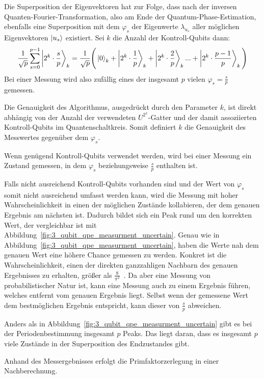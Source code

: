 Die Superposition der Eigenvektoren hat zur Folge, 
dass nach der inversen Quanten-Fourier-Transformation, also am Ende der Quantum-Phase-Estimation,
ebenfalls eine Superposition mit dem \(\varphi_s\) der Eigenwerte \(\lambda_{u_s}\) aller möglichen Eigenvektoren \(\ket{u_s}\) existiert.
Sei \(k\) die Anzahl der Kontroll-Qubits dann:
\[
    \frac{1}{\sqrt{p}} \sum_{s=0}^{p-1}\ket{2^k \cdot \frac{s}{p}}_k   = 
    \frac{1}{\sqrt{p}} \Bigg(\ket{0}_k  + \ket{2^k \cdot \frac{1}{p}}_k + \ket{2^k \cdot \frac{2}{p}}_k  ... + \ket{2^k \cdot \frac{p-1}{p}}_k \Bigg)
\]
Bei einer Messung wird also zufällig eines der insgesamt \(p\) vielen \(\varphi_s = \frac{s}{p}\) gemessen.

Die Genauigkeit des Algorithmus, ausgedrückt durch den Parameter \(k\),
ist direkt abhängig von der Anzahl der verwendeten \(U^{2^x}\)-Gatter
und der damit assoziierten Kontroll-Qubits im Quantenschaltkreis.
Somit definiert \(k\) die Genauigkeit des Messwertes gegenüber dem \(\varphi_s\).

Wenn genügend Kontroll-Qubits verwendet werden, 
wird bei einer Messung ein Zustand gemessen, 
in dem \(\varphi_s\) beziehungsweise \(\frac{s}{p}\) enthalten ist.

Falls nicht ausreichend Kontroll-Qubits vorhanden sind 
und der Wert von \(\varphi_s\) somit nicht ausreichend umfasst werden kann,
wird die Messung mit hoher Wahrscheinlichkeit 
in einen der möglichen Zustände kollabieren, 
der dem genauen Ergebnis am nächsten ist.
Dadurch bildet sich ein Peak rund um den korrekten Wert, 
der vergleichbar ist mit Abbildung~\ref{fig:3_qubit_qpe_measurment_uncertain}.
Genau wie in Abbildung~\ref{fig:3_qubit_qpe_measurment_uncertain}, haben die Werte nah dem genauen Wert
eine höhere Chance gemessen zu werden. 
Konkret ist die Wahrscheinlichkeit, 
einen der direkten ganzzahligen Nachbarn des genauen Ergebnisses zu erhalten, 
größer als \(\frac{8}{\pi^2}\)~\cite[119]{kaye2007introduction}.
Da aber eine Messung von probabilistischer Natur ist, 
kann eine Messung auch zu einem Ergebnis führen, 
welches entfernt vom genauen Ergebnis liegt.
Selbst wenn der gemessene Wert dem bestmöglichen Ergebnis entspricht, 
kann dieser von \(\frac{s}{p}\) abweichen. 

Anders als in Abbildung~\ref{fig:3_qubit_qpe_measurment_uncertain} gibt es bei der Periodenbestimmung insgesamt \(p\) Peaks.
Das liegt daran, dass es insgesamt \(p\) viele Zustände in der Superposition des Endzustandes gibt.

Anhand des Messergebnisses erfolgt die Primfaktorzerlegung in einer Nachberechnung.

